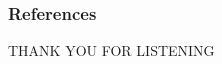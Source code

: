 \documentclass{beamer}
\begin{document}
\begin{frame}[allowframebreaks]
\frametitle{References}

\nocite{*}

\end{frame}


\begin{frame}
\Large{\centerline{THANK YOU FOR LISTENING}}
\end{frame}

\end{document}
